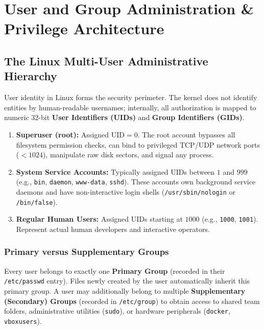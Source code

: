 \chapter{User and Group Administration \& Privilege Architecture}
\label{chap:user-group-admin}

\section{The Linux Multi-User Administrative Hierarchy}
User identity in Linux forms the security perimeter. The kernel does not identify entities by human-readable usernames; internally, all authorization is mapped to numeric 32-bit \textbf{User Identifiers (UIDs)} and \textbf{Group Identifiers (GIDs)}.

\begin{definition}
\begin{enumerate}[leftmargin=1.5em]
    \item \textbf{Superuser (root):} Assigned $\text{UID} = 0$. The root account bypasses all filesystem permission checks, can bind to privileged TCP/UDP network ports ($<1024$), manipulate raw disk sectors, and signal any process.
    \item \textbf{System Service Accounts:} Typically assigned UIDs between $1$ and $999$ (e.g., \texttt{bin}, \texttt{daemon}, \texttt{www-data}, \texttt{sshd}). These accounts own background service daemons and have non-interactive login shells (\texttt{/usr/sbin/nologin} or \texttt{/bin/false}).
    \item \textbf{Regular Human Users:} Assigned UIDs starting at $1000$ (e.g., \texttt{1000}, \texttt{1001}). Represent actual human developers and interactive operators.
\end{enumerate}
\end{definition}

\subsection{Primary versus Supplementary Groups}
Every user belongs to exactly one \textbf{Primary Group} (recorded in their \texttt{/etc/passwd} entry). Files newly created by the user automatically inherit this primary group. A user may additionally belong to multiple \textbf{Supplementary (Secondary) Groups} (recorded in \texttt{/etc/group}) to obtain access to shared team folders, administrative utilities (\texttt{sudo}), or hardware peripherals (\texttt{docker}, \texttt{vboxusers}).

